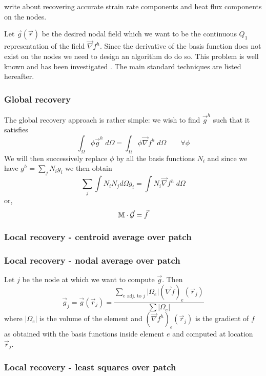 
write about recovering accurate strain rate components and heat flux components on the nodes.

Let $\vec g(\vec r)$  be the desired nodal 
field which we want to be the continuous $Q_1$ representation of the field $\vec \nabla f^h$.
Since the derivative of the basis function does not exist on the nodes we need to design
an algorithm do do so. This problem is well known and has been 
investigated 
.
The main standard techniques are listed hereafter.


\subsubsection{Global recovery}

The global recovery approach is rather simple: we wish to find $\vec g^h$
such that it satisfies
\[
\int_\Omega \phi \vec g^h \; d\Omega  = \int_\Omega \phi \vec\nabla f^h \; d\Omega 
\quad\quad \forall \phi
\] 
We will then successively replace $\phi$ by all the basis functions $N_i$ 
and since we have $g^h=\sum_j N_i g_i$ we then obtain
\[
\sum_j \int N_i N_j d\Omega g_i = \int N_i  \vec\nabla f^h \; d\Omega 
\]
or, 
\[
\mathbb{M} \cdot \vec{\cal G} = \vec f
\]



\subsubsection{Local recovery - centroid average over patch}





\subsubsection{Local recovery - nodal average over patch}

Let $j$ be the node at which we want to compute $\vec g$.
Then 
\[
\vec g_j = \vec g(\vec r_j) = 
\frac{\sum\limits_{ e \text{ adj. to }j} |\Omega_e| (\vec\nabla f)_e(\vec r_j) }{\sum |\Omega_e|}
\]
where $|\Omega_e|$ is the volume of the element and $(\vec\nabla f^h)_e(\vec r_j)$
is the gradient of $f$ as obtained with the basis functions inside element $e$ and 
computed at location $\vec r_j$.

\subsubsection{Local recovery - least squares over patch}



